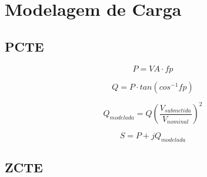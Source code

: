 \documentclass[conference]{IEEEtran}
\begin{document}




%
\IEEEpeerreviewmaketitle




\section{\textbf{Modelagem de Carga}}



\subsection{PCTE}
    
\begin{equation}
P = V A \cdot fp
\end{equation}

\begin{equation}   
Q = P \cdot tan(cos^{-1}fp)
\end{equation}


\begin{equation}   
    Q_{modelada} = Q \left(\frac{V_{submetida}}{V_{nominal}}\right)^2
\end{equation}

\begin{equation}
S = P+jQ_{modelada}
\end{equation}

\subsection{ZCTE}
\end{document}

